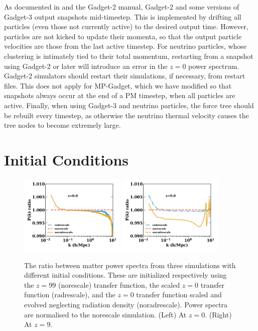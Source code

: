 \documentclass[useAMS, usenatbib]{mnras}
\begin{document}
As documented in \cite{Springel_2005} and the Gadget-2 manual, Gadget-2 and some versions of Gadget-3 output snapshots mid-timestep. This is implemented by drifting all particles (even those not currently active) to the desired output time. However, particles are not kicked to update their momenta, so that the output particle velocities are those from the last active timestep. For neutrino particles, whose clustering is intimately tied to their total momentum, restarting from a snapshot using Gadget-2 or later will introduce an error in the $z=0$ power spectrum. Gadget-2 simulators should restart their simulations, if necessary, from restart files. This does not apply for MP-Gadget, which we have modified so that snapshots always occur at the end of a PM timestep, when all particles are active. Finally, when using Gadget-3 and neutrino particles, the force tree should be rebuilt every timestep, as otherwise the neutrino thermal velocity causes the tree nodes to become extremely large.

\section{Initial Conditions}
\label{sec:initcond}

\begin{figure}
\includegraphics[width=0.45\textwidth]{icplots/pks_rel-1.pdf}
\includegraphics[width=0.45\textwidth]{icplots/pks_rel-0_1.pdf}
  \caption{The ratio between matter power spectra from three simulations with different initial conditions.
  These are initialized respectively using the $z=99$ (norescale) transfer function,
  the scaled $z=0$ transfer function (radrescale), and the $z=0$ transfer function
  scaled and evolved neglecting radiation density (noradrescale). Power spectra are normalised to the norescale simulation.
  (Left) At $z=0$. (Right) At $z=9$.}
  \label{fig:rescaling}
\end{figure}
\end{document}
